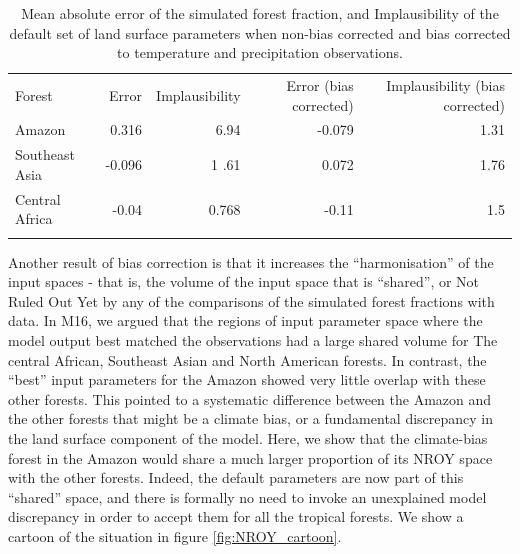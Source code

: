 \documentclass[gmd, manuscript]{copernicus}
\begin{document}
\begin{table}[t]
\caption{Mean absolute error of the simulated forest fraction, and Implausibility of the default set of land surface parameters when non-bias corrected and bias corrected to temperature and precipitation observations.}
\begin{tabular}{lrrrr}
\tophline

Forest                & Error &    Implausibility &  Error (bias corrected) &   Implausibility (bias corrected) \\
\middlehline
Amazon                &       0.316 &         6.94    &    -0.079  &    1.31  \\
Southeast Asia      &      -0.096   &   1       .61 &  0.072      &   1.76\\
Central Africa          & -0.04  &         0.768        & -0.11    & 1.5       \\
\bottomhline
\end{tabular}
\belowtable{} %
\label{tab:default_implausibility}
\end{table}

Another result of bias correction is that it increases the ``harmonisation'' of the input spaces - that is, the volume of the input space that is ``shared'', or Not Ruled Out Yet by any of the comparisons of the simulated forest fractions with data. In M16, we argued that the regions of input parameter space where the model output best matched the observations had a large shared volume for The central African, Southeast Asian and North American forests. In contrast, the ``best'' input parameters for the Amazon showed very little overlap with these other forests. This pointed to a systematic difference between the Amazon and the other forests that might be a climate bias, or a fundamental discrepancy in the land surface component of the model. Here, we show that the climate-bias forest in the Amazon would share a much larger proportion of its NROY space with the other forests. Indeed, the default parameters are now part of this ``shared'' space, and there is formally no need to invoke an unexplained model discrepancy in order to accept them for all the tropical forests. We show a cartoon of the situation in figure \ref{fig:NROY_cartoon}.
\end{document}
